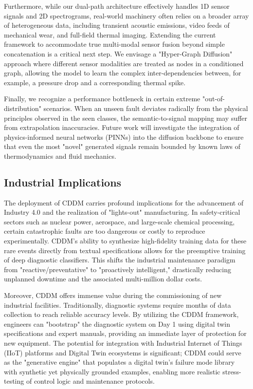 Furthermore, while our dual-path architecture effectively handles 1D sensor signals and 2D spectrograms, real-world machinery often relies on a broader array of heterogeneous data, including transient acoustic emissions, video feeds of mechanical wear, and full-field thermal imaging. Extending the current framework to accommodate true multi-modal sensor fusion beyond simple concatenation is a critical next step. We envisage a "Hyper-Graph Diffusion" approach where different sensor modalities are treated as nodes in a conditioned graph, allowing the model to learn the complex inter-dependencies between, for example, a pressure drop and a corresponding thermal spike.

Finally, we recognize a performance bottleneck in certain extreme "out-of-distribution" scenarios. When an unseen fault deviates radically from the physical principles observed in the seen classes, the semantic-to-signal mapping may suffer from extrapolation inaccuracies. Future work will investigate the integration of physics-informed neural networks (PINNs) into the diffusion backbone to ensure that even the most "novel" generated signals remain bounded by known laws of thermodynamics and fluid mechanics.

\subsection{Industrial Implications}
The deployment of CDDM carries profound implications for the advancement of Industry 4.0 and the realization of "lights-out" manufacturing. In safety-critical sectors such as nuclear power, aerospace, and large-scale chemical processing, certain catastrophic faults are too dangerous or costly to reproduce experimentally. CDDM's ability to synthesize high-fidelity training data for these rare events directly from textual specifications allows for the preemptive training of deep diagnostic classifiers. This shifts the industrial maintenance paradigm from "reactive/preventative" to "proactively intelligent," drastically reducing unplanned downtime and the associated multi-million dollar costs.

Moreover, CDDM offers immense value during the commissioning of new industrial facilities. Traditionally, diagnostic systems require months of data collection to reach reliable accuracy levels. By utilizing the CDDM framework, engineers can "bootstrap" the diagnostic system on Day 1 using digital twin specifications and expert manuals, providing an immediate layer of protection for new equipment. The potential for integration with Industrial Internet of Things (IIoT) platforms and Digital Twin ecosystems is significant; CDDM could serve as the "generative engine" that populates a digital twin's failure mode library with synthetic yet physically grounded examples, enabling more realistic stress-testing of control logic and maintenance protocols.

